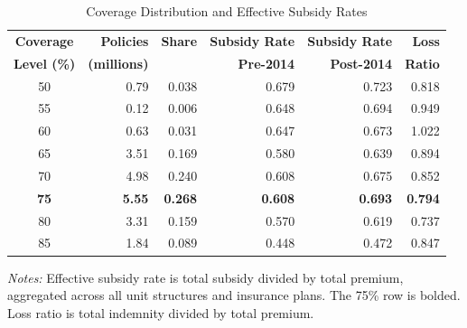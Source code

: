 \begin{table}[htbp]
\centering
\caption{Coverage Distribution and Effective Subsidy Rates}
\label{tab:distribution}
\begin{threeparttable}
\begin{tabular}{crrrrr}
\toprule
\textbf{Coverage} & \textbf{Policies} & \textbf{Share} & \textbf{Subsidy Rate} & \textbf{Subsidy Rate} & \textbf{Loss} \\
\textbf{Level (\%)} & \textbf{(millions)} & & \textbf{Pre-2014} & \textbf{Post-2014} & \textbf{Ratio} \\
\midrule
50 & 0.79 & 0.038 & 0.679 & 0.723 & 0.818 \\
55 & 0.12 & 0.006 & 0.648 & 0.694 & 0.949 \\
60 & 0.63 & 0.031 & 0.647 & 0.673 & 1.022 \\
65 & 3.51 & 0.169 & 0.580 & 0.639 & 0.894 \\
70 & 4.98 & 0.240 & 0.608 & 0.675 & 0.852 \\
\textbf{75} & \textbf{5.55} & \textbf{0.268} & \textbf{0.608} & \textbf{0.693} & \textbf{0.794} \\
80 & 3.31 & 0.159 & 0.570 & 0.619 & 0.737 \\
85 & 1.84 & 0.089 & 0.448 & 0.472 & 0.847 \\
\bottomrule
\end{tabular}
\begin{tablenotes}[flushleft]
\footnotesize
\item \textit{Notes:} Effective subsidy rate is total subsidy divided by total premium, aggregated across all unit structures and insurance plans. The 75\% row is bolded. Loss ratio is total indemnity divided by total premium.
\end{tablenotes}
\end{threeparttable}
\end{table}
